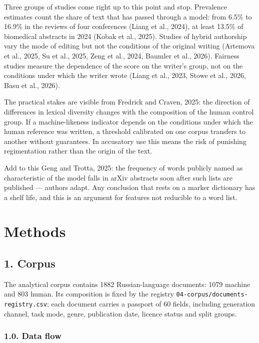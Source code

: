 \documentclass[11pt,a4paper]{article}
\renewcommand{\_}{\textunderscore\allowbreak}
\begin{document}
Three groups of studies come right up to this point and stop. Prevalence
estimates count the share of text that has passed through a model: from 6.5\% to 16.9\%
in the reviews of four conferences (Liang et al., 2024), at least 13.5\% of biomedical abstracts
in 2024 (Kobak et al., 2025). Studies of hybrid authorship vary the mode of editing but not the
conditions of the original writing (Artemova et al., 2025, Su et al., 2025, Zeng et al., 2024, Baumler et al., 2026). Fairness studies measure
the dependence of the score on the writer's group, not on the conditions under which the writer wrote (Liang et al., 2023,
Stowe et al., 2026, Basu et al., 2026).

The practical stakes are visible from Fredrick and Craven, 2025: the direction of differences in lexical
diversity changes with the composition of the human control group. If a
machine-likeness indicator depends on the conditions under which the human
reference was written, a threshold calibrated on one corpus transfers to
another without guarantees. In accusatory use this means the risk of punishing
regimentation rather than the origin of the text.

Add to this Geng and Trotta, 2025: the frequency of words publicly named as characteristic of the model
falls in arXiv abstracts soon after such lists are published — authors adapt.
Any conclusion that rests on a marker dictionary has a shelf life, and this is
an argument for features not reducible to a word list.

\section{Methods}

\subsection{1. Corpus}

The analytical corpus contains 1882 Russian-language documents: 1079 machine and
803 human. Its composition is fixed by the registry \texttt{04-\allowbreak{}corpus/documents-\allowbreak{}registry.csv};
each document carries a passport of 60 fields, including generation channel, task mode,
genre, publication date, licence status and split groups.

\subsubsection{1.0. Data flow}
\end{document}
